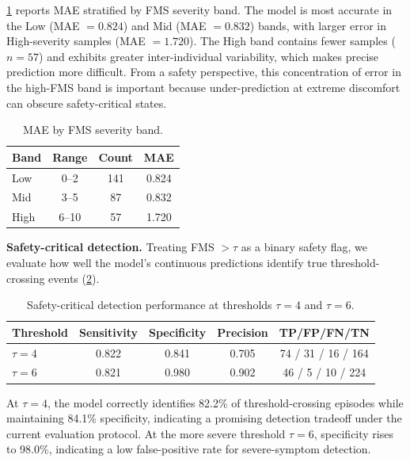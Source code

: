 \documentclass[review]{vgtc}              %
\begin{document}
\cref{tab:bands} reports MAE stratified by FMS severity band. The model is most accurate in the Low (MAE $= 0.824$) and Mid (MAE $= 0.832$) bands, with larger error in High-severity samples (MAE $= 1.720$). The High band contains fewer samples ($n = 57$) and exhibits greater inter-individual variability, which makes precise prediction more difficult. From a safety perspective, this concentration of error in the high-FMS band is important because under-prediction at extreme discomfort can obscure safety-critical states.

\begin{table}[tb]
\centering
\caption{MAE by FMS severity band.}
\begin{tabular}{lccc}
\toprule
\textbf{Band} & \textbf{Range} & \textbf{Count} & \textbf{MAE} \\
\midrule
Low  & 0--2  & 141 & 0.824 \\
Mid  & 3--5  & 87  & 0.832 \\
High & 6--10 & 57  & 1.720 \\
\bottomrule
\end{tabular}
\label{tab:bands}
\end{table}

\textbf{Safety-critical detection.}
Treating FMS $> \tau$ as a binary safety flag, we evaluate how well the model's continuous predictions identify true threshold-crossing events (\cref{tab:detection}).

\begin{table}[tb]
\centering
\caption{Safety-critical detection performance at thresholds $\tau = 4$ and $\tau = 6$.}
\scriptsize
\begin{tabular}{lcccc}
\toprule
\textbf{Threshold} & \textbf{Sensitivity} & \textbf{Specificity} & \textbf{Precision} & \textbf{TP/FP/FN/TN} \\
\midrule
$\tau = 4$ & 0.822 & 0.841 & 0.705 & 74 / 31 / 16 / 164 \\
$\tau = 6$ & 0.821 & 0.980 & 0.902 & 46 / 5 / 10 / 224 \\
\bottomrule
\end{tabular}
\label{tab:detection}
\end{table}

At $\tau = 4$, the model correctly identifies 82.2\% of threshold-crossing episodes while maintaining 84.1\% specificity, indicating a promising detection tradeoff under the current evaluation protocol. At the more severe threshold $\tau = 6$, specificity rises to 98.0\%, indicating a low false-positive rate for severe-symptom detection.
\end{document}
